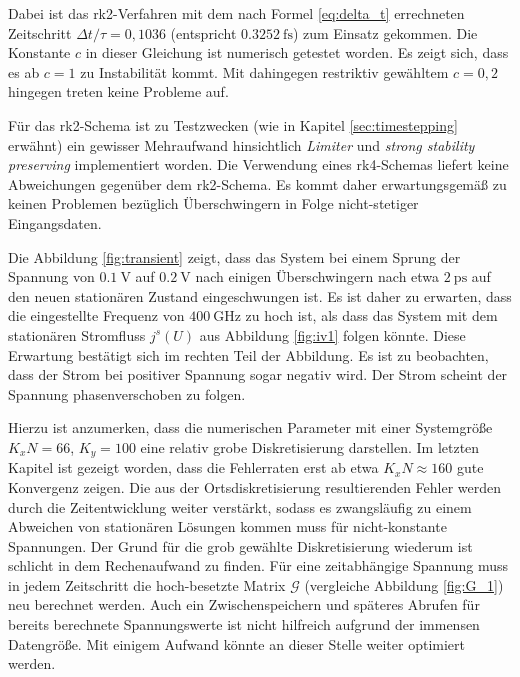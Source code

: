 Dabei ist das \ac{rk}2-Verfahren mit dem nach Formel \eqref{eq:delta_t} errechneten Zeitschritt ${\Delta t / \tau = 0,1036}$ (entspricht $\SI{0.3252}{\femto\second}$) zum Einsatz gekommen. Die Konstante $c$ in dieser Gleichung ist numerisch getestet worden. Es zeigt sich, dass es ab $c=1$ zu Instabilität kommt. Mit dahingegen restriktiv gewähltem $c=0,2$ hingegen treten keine Probleme auf.

Für das \ac{rk}2-Schema ist zu Testzwecken (wie in Kapitel \ref{sec:timestepping} erwähnt) ein gewisser Mehraufwand hinsichtlich \emph{Limiter} und \emph{strong stability preserving} implementiert worden. Die Verwendung eines \ac{rk}4-Schemas liefert keine Abweichungen gegenüber dem \ac{rk}2-Schema. Es kommt daher erwartungsgemäß zu keinen Problemen bezüglich Überschwingern in Folge nicht-stetiger Eingangsdaten.

Die Abbildung \ref{fig:transient} zeigt, dass das System bei einem Sprung der Spannung von $\SI{0.1}{\volt}$ auf $\SI{0.2}{\volt}$ nach einigen Überschwingern nach etwa $\SI{2}{\pico\second}$ auf den neuen stationären Zustand eingeschwungen ist. Es ist daher zu erwarten, dass die eingestellte Frequenz von $\SI{400}{\giga\hertz}$ zu hoch ist, als dass das System mit dem stationären Stromfluss $j^s(U)$ aus Abbildung \ref{fig:iv1} folgen könnte. Diese Erwartung bestätigt sich im rechten Teil der Abbildung. Es ist zu beobachten, dass der Strom bei positiver Spannung sogar negativ wird. Der Strom scheint der Spannung phasenverschoben zu folgen.

Hierzu ist anzumerken, dass die numerischen Parameter mit einer Systemgröße $K_xN=66$, $K_y=100$ eine relativ grobe Diskretisierung darstellen. Im letzten Kapitel ist gezeigt worden, dass die Fehlerraten erst ab etwa $K_x N \approx 160$ gute Konvergenz zeigen. Die aus der Ortsdiskretisierung resultierenden Fehler werden durch die Zeitentwicklung weiter verstärkt, sodass es zwangsläufig zu einem Abweichen von stationären Lösungen kommen muss für nicht-konstante Spannungen. Der Grund für die grob gewählte Diskretisierung wiederum ist schlicht in dem Rechenaufwand zu finden. Für eine zeitabhängige Spannung muss in jedem Zeitschritt die hoch-besetzte Matrix $\mathcal{G}$ (vergleiche Abbildung \ref{fig:G_1}) neu berechnet werden. Auch ein Zwischenspeichern und späteres Abrufen für bereits berechnete Spannungswerte ist nicht hilfreich aufgrund der immensen Datengröße. Mit einigem Aufwand könnte an dieser Stelle weiter optimiert werden.
